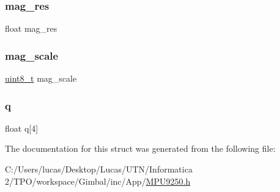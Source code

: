\subsubsection{\texorpdfstring{mag\_res}{mag\_res}}
{\footnotesize\ttfamily float mag\+\_\+res}

\mbox{\label{struct_m_p_u9250__params__t_a6e3d126ef32c3eaf44caeeb393c3ba3b}} 
\subsubsection{\texorpdfstring{mag\_scale}{mag\_scale}}
{\footnotesize\ttfamily \mbox{\hyperlink{_regs___l_p_c176x_8h_aba7bc1797add20fe3efdf37ced1182c5}{uint8\+\_\+t}} mag\+\_\+scale}

\mbox{\label{struct_m_p_u9250__params__t_acbffa34110f15b21994d3d087a0f4e7f}} 
\subsubsection{\texorpdfstring{q}{q}}
{\footnotesize\ttfamily float q\mbox{[}4\mbox{]}}



The documentation for this struct was generated from the following file\+:\begin{DoxyCompactItemize}
\item 
C\+:/\+Users/lucas/\+Desktop/\+Lucas/\+U\+T\+N/\+Informatica 2/\+T\+P\+O/workspace/\+Gimbal/inc/\+App/\mbox{\hyperlink{_m_p_u9250_8h}{M\+P\+U9250.\+h}}\end{DoxyCompactItemize}
